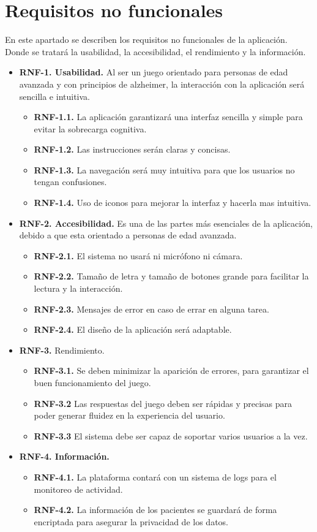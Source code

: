 \section{Requisitos no funcionales}
En este apartado se describen los requisitos no funcionales de la aplicación. Donde se tratará la usabilidad, la accesibilidad, el rendimiento y la información.
\begin{itemize}
    \item \textbf{RNF-1. Usabilidad.}  Al ser un juego orientado para personas de edad avanzada y con principios de alzheimer, la interacción con la aplicación será sencilla e intuitiva.
    \begin{itemize}
        \item \textbf{RNF-1.1.} La aplicación garantizará una interfaz sencilla y simple para evitar la sobrecarga cognitiva.
        \item \textbf{RNF-1.2.} Las instrucciones serán claras y concisas.
        \item \textbf{RNF-1.3.} La navegación será muy intuitiva para que los usuarios no tengan confusiones.
        \item \textbf{RNF-1.4.} Uso de iconos para mejorar la interfaz y hacerla mas intuitiva.
    \end{itemize}
    \item \textbf{RNF-2. Accesibilidad.} Es una de las partes más esenciales de la aplicación, debido a que esta orientado a personas de edad avanzada.
    \begin{itemize}
        \item \textbf{RNF-2.1.} El sistema no usará ni micrófono ni cámara.
        \item \textbf{RNF-2.2.} Tamaño de letra y tamaño de botones grande para facilitar la lectura y la interacción.
        \item \textbf{RNF-2.3.} Mensajes de error en caso de errar en alguna tarea.
        \item \textbf{RNF-2.4.} El diseño de la aplicación será adaptable.
    \end{itemize}
    \item \textbf{RNF-3.} Rendimiento. 
    \begin{itemize}
        \item \textbf{RNF-3.1.} Se deben minimizar la aparición de errores, para garantizar el buen funcionamiento del juego.
        \item \textbf{RNF-3.2} Las respuestas del juego deben ser rápidas y precisas para poder generar fluidez en la experiencia del usuario.
        \item \textbf{RNF-3.3} El sistema debe ser capaz de soportar varios usuarios a la vez.
    \end{itemize}
    \item \textbf{RNF-4. Información.} 
    \begin{itemize}
        \item \textbf{RNF-4.1.} La plataforma contará con un sistema de logs para el monitoreo de actividad.
        \item \textbf{RNF-4.2.} La información de los pacientes se guardará de forma encriptada para asegurar la privacidad de los datos.
        

\end{itemize}
\end{itemize}
